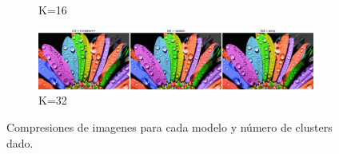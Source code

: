 \begin{figure}[H]
\begin{subfigure}{17cm}
        \caption{K=16}
    \end{subfigure}
    \begin{subfigure}{17cm}
        \centering
        \includegraphics[width=17cm]{Graphics/Problema_04/cluster_32.png}
        \caption{K=32}
    \end{subfigure}
    \caption{Compresiones de imagenes para cada modelo y número de clusters dado.}
\end{figure}
